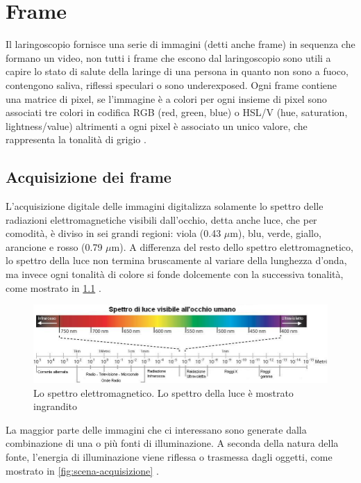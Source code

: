\chapter{Frame}\label{frame}

Il laringoscopio fornisce una serie di immagini (detti anche frame) in sequenza che formano un video, non tutti i frame che escono dal laringoscopio sono utili a capire lo stato di salute della laringe di una persona in quanto non sono a fuoco, contengono saliva, riflessi speculari o sono underexposed. Ogni frame contiene una matrice di pixel, se l'immagine è a colori per ogni insieme di pixel sono associati tre colori in codifica RGB (red, green, blue) o HSL/V (hue, saturation, lightness/value) altrimenti a ogni pixel è associato un unico valore, che rappresenta la tonalità di grigio \cite{gonzalez_dip}.

\section{Acquisizione dei frame}\label{acquisizione-dei-frame}

L'acquisizione digitale delle immagini digitalizza solamente lo spettro delle radiazioni elettromagnetiche visibili dall'occhio, detta anche luce, che per comodità, è diviso in sei grandi regioni: viola (0.43 \(\mu \)m), blu, verde, giallo, arancione e rosso (0.79 \(\mu \)m). A differenza del resto dello spettro elettromagnetico, lo spettro della luce non termina bruscamente al variare della lunghezza d'onda, ma invece ogni tonalità di colore si fonde dolcemente con
la successiva tonalità, come mostrato in \cref{fig:spettro-onde} \cite{gonzalez_dip}.

\begin{figure}[ht]
    \centering
    \includegraphics[width=1\textwidth]{frame/Spettro-onde.jpg}
    \caption{Lo spettro elettromagnetico. Lo spettro della luce è mostrato ingrandito}
    \label{fig:spettro-onde}
\end{figure}

La maggior parte delle immagini che ci interessano sono generate dalla combinazione di una o più fonti di illuminazione. A seconda della natura della fonte, l'energia di illuminazione viene riflessa o trasmessa dagli oggetti, come mostrato in \cref{fig:scena-acquisizione} \cite{gonzalez_dip}.

